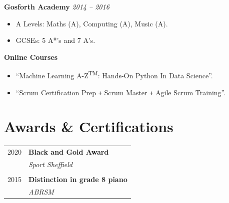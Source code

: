 \documentclass[10pt]{article} %
\begin{document}
\begin{changemargin}{0pt}{0.5pt}
\begin{minipage}[t]{0.44\textwidth}
\begin{changemargin}{5pt}{5pt}
	
	\textbf{Gosforth Academy} \hfill \textit{ 2014 --  2016}
	\vspace{-5pt}
	\begin{itemize} \itemsep-2pt %
		\item A Levels: Maths (A), Computing (A), Music (A).
		\item GCSEs: 5 A*'s and 7 A's.
	\end{itemize}
	
\end{changemargin}


\begin{changemargin}{5pt}{5pt}
	
	\textbf{Online Courses}
	\vspace{-5pt}
	\begin{itemize} \itemsep-2pt %
		\item \enquote{Machine Learning A-Z\textsuperscript{TM}: Hands-On Python In Data Science}.
		\item \enquote{Scrum Certification Prep \texttt{+} Scrum Master \texttt{+} Agile Scrum Training}.
	\end{itemize}
	
\end{changemargin}


\section{Awards \& Certifications}

\begin{tabular}{rl}
	
	2020	 & \textbf{Black and Gold Award}\\ & \textit{Sport Sheffield} \\ \\
	
	
	2015	 & \textbf{Distinction in grade 8 piano}\\ & \textit{ABRSM}
\end{tabular}\\[10pt]


\end{minipage}
\end{changemargin}
\end{document}
